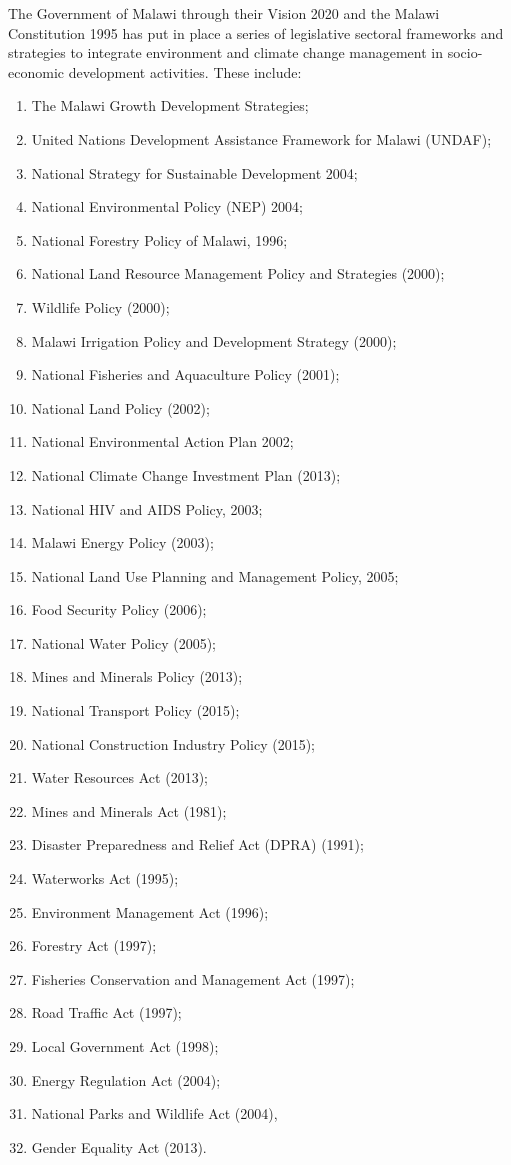 \documentclass[
]{book}
\providecommand{\tightlist}{%
  \setlength{\itemsep}{0pt}\setlength{\parskip}{0pt}}
\begin{document}
The Government of Malawi through their Vision 2020 and the Malawi Constitution 1995 has put in place a series of legislative sectoral frameworks and strategies to integrate environment and climate change management in socio-economic development activities. These include:

\begin{enumerate}
\def\labelenumi{\roman{enumi}.}
\tightlist
\item
  The Malawi Growth Development Strategies;
\item
  United Nations Development Assistance Framework for Malawi (UNDAF);
\item
  National Strategy for Sustainable Development 2004;
\item
  National Environmental Policy (NEP) 2004;
\item
  National Forestry Policy of Malawi, 1996;
\item
  National Land Resource Management Policy and Strategies (2000);
\item
  Wildlife Policy (2000);
\item
  Malawi Irrigation Policy and Development Strategy (2000);
\item
  National Fisheries and Aquaculture Policy (2001);
\item
  National Land Policy (2002);
\item
  National Environmental Action Plan 2002;
\item
  National Climate Change Investment Plan (2013);
\item
  National HIV and AIDS Policy, 2003;
\item
  Malawi Energy Policy (2003);
\item
  National Land Use Planning and Management Policy, 2005;
\item
  Food Security Policy (2006);
\item
  National Water Policy (2005);
\item
  Mines and Minerals Policy (2013);
\item
  National Transport Policy (2015);
\item
  National Construction Industry Policy (2015);
\item
  Water Resources Act (2013);
\item
  Mines and Minerals Act (1981);
\item
  Disaster Preparedness and Relief Act (DPRA) (1991);
\item
  Waterworks Act (1995);
\item
  Environment Management Act (1996);
\item
  Forestry Act (1997);
\item
  Fisheries Conservation and Management Act (1997);
\item
  Road Traffic Act (1997);
\item
  Local Government Act (1998);
\item
  Energy Regulation Act (2004);
\item
  National Parks and Wildlife Act (2004),
\item
  Gender Equality Act (2013).
\end{enumerate}
\end{document}
